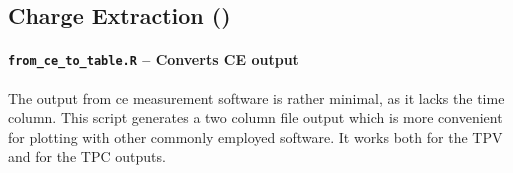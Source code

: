 

	\subsection{Charge Extraction ()}\label{r_ce}

		\paragraph{\texttt{from\_ce\_to\_table.R} -- Converts CE output}
		The output from \gls{ce} measurement software is rather minimal, as it lacks the time column.
		This script generates a two column file output which is more convenient for plotting with other commonly employed software.
		It works both for the TPV and for the TPC outputs.
		

